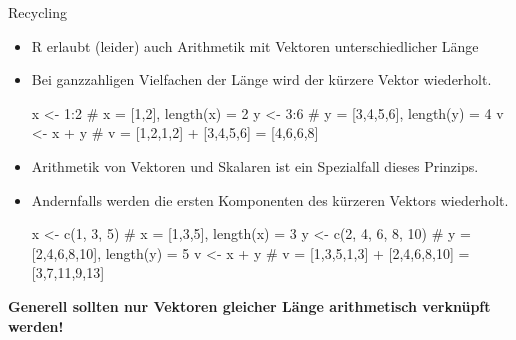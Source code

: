 \documentclass[
  8pt,
  ignorenonframetext,
]{beamer}
\newenvironment{Shaded}{\begin{snugshade}}{\end{snugshade}}
\newcommand{\CommentTok}[1]{\textcolor[rgb]{0.37,0.37,0.37}{#1}}
\newcommand{\DecValTok}[1]{\textcolor[rgb]{0.68,0.00,0.00}{#1}}
\newcommand{\FunctionTok}[1]{\textcolor[rgb]{0.28,0.35,0.67}{#1}}
\newcommand{\NormalTok}[1]{\textcolor[rgb]{0.00,0.23,0.31}{#1}}
\newcommand{\OtherTok}[1]{\textcolor[rgb]{0.00,0.23,0.31}{#1}}
\newcommand{\SpecialCharTok}[1]{\textcolor[rgb]{0.37,0.37,0.37}{#1}}
\begin{document}
\begin{frame}[fragile]{Recycling}
\protect\hypertarget{recycling}{}
\small
{}

\begin{itemize}
\item
  R erlaubt (leider) auch Arithmetik mit Vektoren unterschiedlicher
  Länge
\item
  Bei ganzzahligen Vielfachen der Länge wird der kürzere Vektor
  wiederholt. \footnotesize

\begin{Shaded}
\begin{Highlighting}[]
\NormalTok{x }\OtherTok{\textless{}{-}} \DecValTok{1}\SpecialCharTok{:}\DecValTok{2}                \CommentTok{\# x = [1,2], length(x) = 2}
\NormalTok{y }\OtherTok{\textless{}{-}} \DecValTok{3}\SpecialCharTok{:}\DecValTok{6}                \CommentTok{\# y = [3,4,5,6], length(y) = 4}
\NormalTok{v }\OtherTok{\textless{}{-}}\NormalTok{ x }\SpecialCharTok{+}\NormalTok{ y              }\CommentTok{\# v = [1,2,1,2] + [3,4,5,6] = [4,6,6,8]}
\end{Highlighting}
\end{Shaded}
\item
  \small Arithmetik von Vektoren und Skalaren ist ein Spezialfall dieses
  Prinzips.
\item
  Andernfalls werden die ersten Komponenten des kürzeren Vektors
  wiederholt. \footnotesize

\begin{Shaded}
\begin{Highlighting}[]
\NormalTok{x }\OtherTok{\textless{}{-}} \FunctionTok{c}\NormalTok{(}\DecValTok{1}\NormalTok{, }\DecValTok{3}\NormalTok{, }\DecValTok{5}\NormalTok{)         }\CommentTok{\# x = [1,3,5], length(x) = 3}
\NormalTok{y }\OtherTok{\textless{}{-}} \FunctionTok{c}\NormalTok{(}\DecValTok{2}\NormalTok{, }\DecValTok{4}\NormalTok{, }\DecValTok{6}\NormalTok{, }\DecValTok{8}\NormalTok{, }\DecValTok{10}\NormalTok{)  }\CommentTok{\# y = [2,4,6,8,10], length(y) = 5}
\NormalTok{v }\OtherTok{\textless{}{-}}\NormalTok{ x }\SpecialCharTok{+}\NormalTok{ y              }\CommentTok{\# v = [1,3,5,1,3] + [2,4,6,8,10] = [3,7,11,9,13]}
\end{Highlighting}
\end{Shaded}
\end{itemize}

\vfill
\center
\color{darkcyan}

\textbf{Generell sollten nur Vektoren gleicher Länge arithmetisch
verknüpft werden!}

\vfill
\end{frame}
\end{document}
